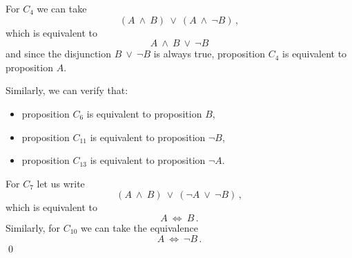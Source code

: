 \documentclass[11pt,paper=b5,footinclude,headinclude]{scrbook} %
\def\ali {{~\vee~}}
\def\inn {{~\wedge~}}
\def\cee {{~\Leftrightarrow~}}
\theoremstyle{remark}
\theoremstyle{definition} %
\theoremstyle{theorem} %
\begin{document}
For $C_4$ we can take $$(A\inn B) \ali (A\inn \neg B)\,,$$
which is equivalent to
$$A\inn B \ali \neg B$$
and since the disjunction $B \ali \neg B$ is always true, proposition $C_4$ is equivalent to proposition $A$.

Similarly, we can verify that:
\begin{itemize}
	\item  proposition $C_6$ is equivalent to proposition $B$,
	\item  proposition $C_{11}$ is equivalent to proposition $\neg B$,
	\item  proposition $C_{13}$ is equivalent to proposition $\neg A$.
\end{itemize}
For $C_7$ let us write
$$(A\inn B) \ali (\neg A\ali \neg B)\,,$$
which is equivalent to
$$A\cee B\,.$$
Similarly, for $C_{10}$ we can take the equivalence
$$A\cee \neg B\,.$$
\qed
\end{document}
